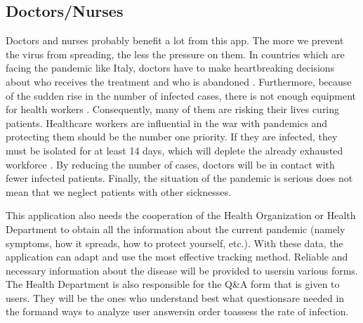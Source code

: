   \subsection{Doctors/Nurses}
    \par Doctors and nurses probably benefit a lot from this app. The more we prevent the virus from spreading, the less the pressure on them. In countries which are facing the pandemic like Italy, doctors have to make heartbreaking decisions about who receives the treatment and who is abandoned \parencite{Stake3}. Furthermore, because of the sudden rise in the number of infected cases, there is not enough equipment for health workers \parencite{Stake4}. Consequently, many of them are risking their lives curing patients. Healthcare workers are influential in the war with pandemics and protecting them should be the number one priority. If they are infected, they must be isolated for at least 14 days, which will deplete the already exhausted workforce \parencite{Stake5}. By reducing the number of cases, doctors will be in contact with fewer infected patients. Finally, the situation of the pandemic is serious does not mean that we neglect patients with other sicknesses.
    \par This  application  also  needs  the  cooperation  of  the  Health  Organization  or Health Department to obtain all the information about the current pandemic (namely symptoms,  how  it  spreads,  how  to  protect  yourself,  etc.).  With  these  data,  the application  can  adapt  and  use  the  most  effective  tracking  method. Reliable and necessary information about the disease will be provided to usersin various forms. The Health Department is also responsible for the Q\&A form that is given to users. They will be the ones who understand best what questionsare needed in the formand ways to analyze user answersin order toassess the rate of infection.

